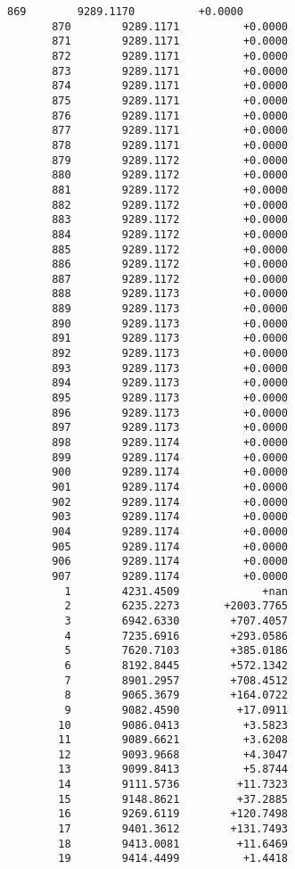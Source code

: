 \documentclass[11pt]{article}
\begin{document}
\begin{Verbatim}[commandchars=\\\{\}]
       869        9289.1170          +0.0000
       870        9289.1171          +0.0000
       871        9289.1171          +0.0000
       872        9289.1171          +0.0000
       873        9289.1171          +0.0000
       874        9289.1171          +0.0000
       875        9289.1171          +0.0000
       876        9289.1171          +0.0000
       877        9289.1171          +0.0000
       878        9289.1171          +0.0000
       879        9289.1172          +0.0000
       880        9289.1172          +0.0000
       881        9289.1172          +0.0000
       882        9289.1172          +0.0000
       883        9289.1172          +0.0000
       884        9289.1172          +0.0000
       885        9289.1172          +0.0000
       886        9289.1172          +0.0000
       887        9289.1172          +0.0000
       888        9289.1173          +0.0000
       889        9289.1173          +0.0000
       890        9289.1173          +0.0000
       891        9289.1173          +0.0000
       892        9289.1173          +0.0000
       893        9289.1173          +0.0000
       894        9289.1173          +0.0000
       895        9289.1173          +0.0000
       896        9289.1173          +0.0000
       897        9289.1173          +0.0000
       898        9289.1174          +0.0000
       899        9289.1174          +0.0000
       900        9289.1174          +0.0000
       901        9289.1174          +0.0000
       902        9289.1174          +0.0000
       903        9289.1174          +0.0000
       904        9289.1174          +0.0000
       905        9289.1174          +0.0000
       906        9289.1174          +0.0000
       907        9289.1174          +0.0000
         1        4231.4509             +nan
         2        6235.2273       +2003.7765
         3        6942.6330        +707.4057
         4        7235.6916        +293.0586
         5        7620.7103        +385.0186
         6        8192.8445        +572.1342
         7        8901.2957        +708.4512
         8        9065.3679        +164.0722
         9        9082.4590         +17.0911
        10        9086.0413          +3.5823
        11        9089.6621          +3.6208
        12        9093.9668          +4.3047
        13        9099.8413          +5.8744
        14        9111.5736         +11.7323
        15        9148.8621         +37.2885
        16        9269.6119        +120.7498
        17        9401.3612        +131.7493
        18        9413.0081         +11.6469
        19        9414.4499          +1.4418

\end{Verbatim}
\end{document}
